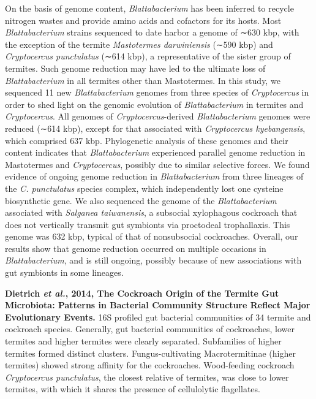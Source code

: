 \documentclass[11pt]{article}
\begin{document}
\begin{sloppypar}
On the basis of genome content, \textit{Blattabacterium} has been inferred to recycle nitrogen wastes and provide amino acids and cofactors for its hosts. 
Most \textit{Blattabacterium} strains sequenced to date harbor a genome of ∼630 kbp, with the exception of the termite \textit{Mastotermes darwiniensis} (∼590 kbp) and \textit{Cryptocercus punctulatus} (∼614 kbp), a representative of the sister group of termites. 
Such genome reduction may have led to the ultimate loss of \textit{Blattabacterium} in all termites other than Mastotermes. 
In this study, we sequenced 11 new \textit{Blattabacterium} genomes from three species of \textit{Cryptocercus} in order to shed light on the genomic evolution of \textit{Blattabacterium} in termites and \textit{Cryptocercus}. 
All genomes of \textit{Cryptocercus}-derived \textit{Blattabacterium} genomes were reduced (∼614 kbp), except for that associated with \textit{Cryptocercus kyebangensis}, which comprised 637 kbp. 
Phylogenetic analysis of these genomes and their content indicates that \textit{Blattabacterium} experienced parallel genome reduction in Mastotermes and \textit{Cryptocercus}, possibly due to similar selective forces. 
We found evidence of ongoing genome reduction in \textit{Blattabacterium} from three lineages of the \textit{C. punctulatus} species complex, which independently lost one cysteine biosynthetic gene. 
We also sequenced the genome of the \textit{Blattabacterium} associated with \textit{Salganea taiwanensis}, a subsocial xylophagous cockroach that does not vertically transmit gut symbionts via proctodeal trophallaxis. 
This genome was 632 kbp, typical of that of nonsubsocial cockroaches. 
Overall, our results show that genome reduction occurred on multiple occasions in \textit{Blattabacterium}, and is still ongoing, possibly because of new associations with gut symbionts in some lineages.
\par
\textbf{Dietrich \textit{et al.}, 2014, The Cockroach Origin of the Termite Gut Microbiota: Patterns in Bacterial Community Structure Reflect Major Evolutionary Events.} \newline
16S profiled gut bacterial communities of 34 termite and cockroach species. 
Generally, gut bacterial communities of cockroaches, lower termites and higher termites were clearly separated. 
Subfamilies of higher termites formed distinct clusters. 
Fungus-cultivating Macrotermitinae (higher termites) showed strong affinity for the cockroaches.
Wood-feeding cockroach \textit{Cryptocercus punctulatus}, the closest relative of termites, was close to lower termites, with which it shares the presence of cellulolytic flagellates. 

\end{sloppypar}
\end{document}
